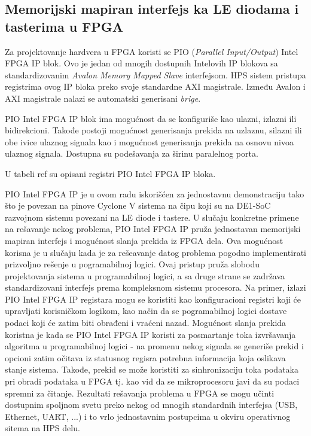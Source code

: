 \subsection{Memorijski mapiran interfejs ka LE diodama i tasterima u FPGA}
Za projektovanje hardvera u FPGA koristi se PIO (\textit{Parallel Input/Output}) Intel FPGA IP blok. Ovo je jedan od mnogih dostupnih Intelovih IP blokova sa standardizovanim \textit{Avalon Memory Mapped Slave} interfejsom. HPS sistem pristupa registrima ovog IP bloka preko svoje standardne AXI magistrale. Između Avalon i AXI magistrale nalazi se automatski generisani \textit{brige}.

PIO Intel FPGA IP blok ima mogućnost da se konfiguriše kao ulazni, izlazni ili bidirekcioni. Takođe postoji mogućnost generisanja prekida na uzlaznu, silazni ili obe ivice ulaznog signala kao i mogućnost generisanja prekida na osnovu nivoa ulaznog signala. Dostupna su podešavanja za širinu paralelnog porta.

U tabeli ref su opisani registri PIO Intel FPGA IP bloka.

PIO Intel FPGA IP je u ovom radu iskorišćen za jednostavnu demonstraciju tako što je povezan na pinove Cyclone V sistema na čipu koji su na DE1-SoC razvojnom sistemu povezani na LE diode i tastere. U slučaju konkretne primene na rešavanje nekog problema, PIO Intel FPGA IP pruža jednostavan memorijski mapiran interfejs i mogućnost slanja prekida iz FPGA dela. Ova mogućnost korisna je u slučaju kada je za rešeavanje datog problema pogodno implementirati prizvoljno rešenje u pogramabilnoj logici. Ovaj pristup pruža slobodu projektovanja sistema u programabilnoj logici, a sa druge strane se zadržava standardizovani interfejs prema kompleksnom sistemu procesora. Na primer, izlazi PIO Intel FPGA IP registara mogu se koristiti kao konfiguracioni registri koji će upravljati korisničkom logikom, kao način da se pogramabilnoj logici dostave podaci koji će zatim biti obrađeni i vraćeni nazad. Mogućnost slanja prekida koristna je kada se PIO Intel FPGA IP koristi za posmartanje toka izvršavanja algoritma u programabilnoj logici - na promenu nekog signala se generiše prekid i opcioni zatim očitava iz statusnog regisra potrebna informacija koja oslikava stanje sistema. Takođe, prekid se može koristiti za sinhronizaciju toka podataka pri obradi podataka u FPGA tj. kao vid da se mikroprocesoru javi da su podaci spremni za čitanje. Rezultati rešavanja problema u FPGA se mogu učinti dostupnim spoljnom svetu preko nekog od mnogih standardnih interfejsa (USB, Ethernet, UART, ...) i to vrlo jednostavnim postupcima u okviru operativnog sitema na HPS delu.

